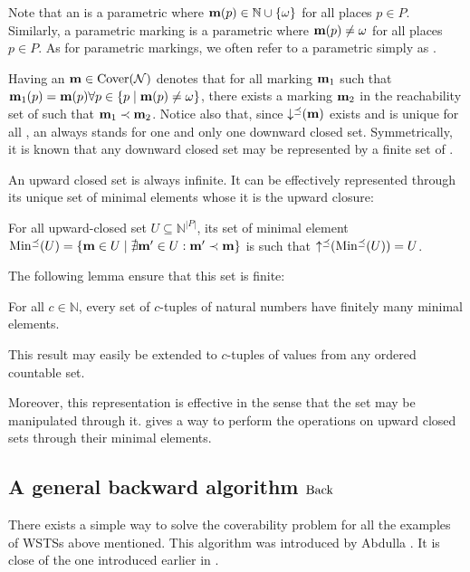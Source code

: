 Note that an \omark \mar is a parametric \omark where $\mathbf{m}(p) \in \mathbb{N} \cup \{\omega\}$ for all places $p \in P$.
Similarly, a parametric marking \mar is a parametric \omark where $\mathbf{m}(p) \neq \omega$ for all places $p \in P$.
As for parametric markings, we often refer to a parametric \omark simply as \omark.

Having an \omark $\mathbf{m} \in \operatorname{Cover}(\mathcal{N})$ denotes that for all marking $\mathbf{m}_1$ such that $\mathbf{m}_1(p) = \mathbf{m}(p) \forall p \in \{p \mid \mathbf{m}(p) \neq \omega\}$, there exists a marking $\mathbf{m}_2$ in the reachability set of \N such that $\mathbf{m}_1 \prec \mathbf{m}_2$.
Notice also that, since $\operatorname{\downarrow^\preceq}(\mathbf{m})$ exists and is unique for all \omark \mar, an \omark always stands for one and only one downward closed set.
Symmetrically, it is known that any downward closed set may be represented by a finite set of \omarks \citep{Geeraerts06}. 

An upward closed set is always infinite.
It can be effectively represented through its unique set of minimal elements whose it is the upward closure:
\begin{lemm}
  For all upward-closed set $U \subseteq \mathbb{N}^{|P|}$, its set of minimal element $\operatorname{Min^\preceq}(U) = \{\mathbf{m} \in U \mid \nexists \mathbf{m'} \in U : \mathbf{m'} \prec \mathbf{m}\}$ is such that $\operatorname{\uparrow^\preceq}(\operatorname{Min^\preceq}(U)) = U$.
\end{lemm}

The following lemma ensure that this set is finite:
\begin{lemm}
  For all $c \in \mathbb{N}$, every set of $c$-tuples of natural numbers have finitely many minimal elements.
\end{lemm}
This result may easily be extended to $c$-tuples of values from any ordered countable set.

Moreover, this representation is effective in the sense that the set may be manipulated through it.
\cite{Ganty09} gives a way to perform the operations on upward closed sets through their minimal elements.

\subsection{A general backward algorithm $\operatorname{Back}$}
\label{sec:backward-algorithm}

There exists a simple way to solve the coverability problem for all the examples of \acp{WSTS} above mentioned.
This algorithm was introduced by Abdulla  \citep{Abdulla96}.
It is close of the one introduced earlier in \cite{Finkel90}.

